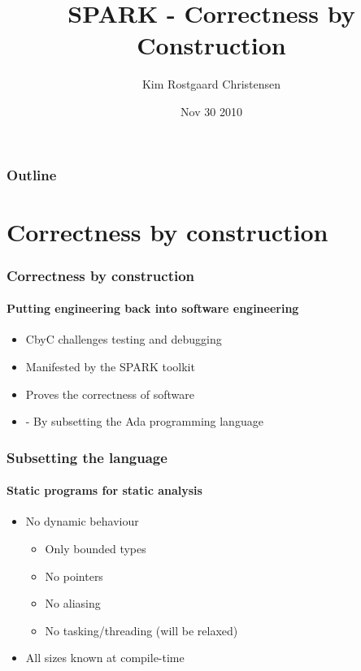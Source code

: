 \documentclass[presentation]{beamer}   %
\begin{document}

\author{Kim Rostgaard Christensen}
\title{SPARK - Correctness by Construction}

\date{Nov 30 2010}

\begin{frame}
  \maketitle
\end{frame}

\begin{frame}
  \frametitle{Outline}
  \tableofcontents
\end{frame}

\section{Correctness by construction}
\begin{frame}
  \frametitle{Correctness by construction}
  \framesubtitle{Putting engineering back into software engineering}
  \begin{itemize}
    \item CbyC challenges testing and debugging
    \item Manifested by the SPARK toolkit
    \item Proves the correctness of software
    \item  - By subsetting the Ada programming language
  \end{itemize}
\end{frame}

\begin{frame}
  \frametitle{Subsetting the language}
  \framesubtitle{Static programs for static analysis}
  \begin{itemize}
    \item No dynamic behaviour
      \begin{itemize}
        \item Only bounded types
        \item No pointers
        \item No aliasing
        \item No tasking/threading (will be relaxed)
      \end{itemize}
    \item All sizes known at compile-time
  \end{itemize}
\end{frame}
\end{document}
